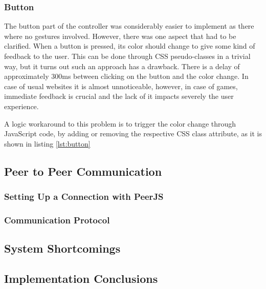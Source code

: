 \subsubsection{Button}

The button part of the controller was considerably easier to implement as there
where no gestures involved. However, there was one aspect that had to be
clarified. When a button is pressed, its color should change to give some kind
of feedback to the user. This can be done through CSS pseudo-classes in a
trivial way, but it turns out such an approach has a drawback. There is a delay
of approximately 300ms between clicking on the button and the color change. In
case of usual websites it is almost unnoticeable, however, in case of games,
immediate feedback is crucial and the lack of it impacts severely the user
experience.

A logic workaround to this problem is to trigger the color change through
JavaScript code, by adding or removing the respective CSS class attribute, as it
is shown in listing \ref{lst:button}




\subsection{Peer to Peer Communication}

\subsubsection{Setting Up a Connection with PeerJS}

\subsubsection{Communication Protocol}

\subsection{System Shortcomings}

\subsection{Implementation Conclusions}

\clearpage
